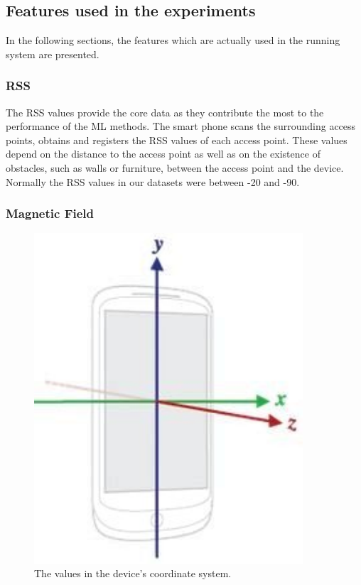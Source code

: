 \subsection{Features used in the experiments}

In the following sections, the features which are actually used in the running system are presented.


\subsubsection{RSS}
\label{sec:RSS}
The RSS values provide the core data as they contribute the most to the performance of the ML methods. The smart phone scans the surrounding access points, obtains and registers the RSS values of each access point. These values depend on the distance to the access point as well as on the existence of obstacles, such as walls or furniture, between the access point and the device. Normally the RSS values in our datasets were between -20 and -90.

\subsubsection{Magnetic Field}
\label{sec:MagneticField}


\begin{figure}[H]
\centering
\includegraphics[width=100mm]{Figures/Device.jpg}
\decoRule
\caption[Device]{The values in the device's coordinate system.}
\label{fig:Device}
\end{figure}

